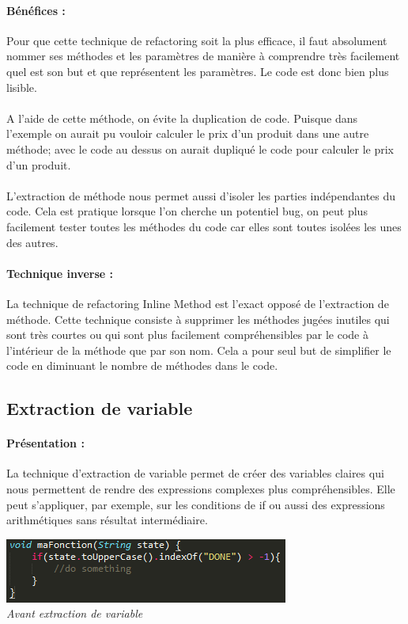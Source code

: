 \documentclass[a4paper,twoside,12pt,openright]{report}
\begin{document}
\paragraph{Bénéfices :}
Pour que cette technique de refactoring soit la plus efficace, il faut absolument nommer ses méthodes et les paramètres de manière à comprendre très facilement quel est son but et que représentent les paramètres. Le code est donc bien plus lisible.\\\\
A l'aide de cette méthode, on évite la duplication de code. Puisque dans l'exemple on aurait pu vouloir calculer le prix d'un produit dans une autre méthode; avec le code au dessus on aurait dupliqué le code pour calculer le prix d'un produit.\\\\
L'extraction de méthode nous permet aussi d'isoler les parties indépendantes du code. Cela est pratique lorsque l'on cherche un potentiel bug, on peut plus facilement tester toutes les méthodes du code car elles sont toutes isolées les unes des autres.

\paragraph{Technique inverse :}
La technique de refactoring Inline Method est l'exact opposé de l'extraction de méthode. Cette technique consiste à supprimer les méthodes jugées inutiles qui sont très courtes ou qui sont plus facilement compréhensibles par le code à l'intérieur de la méthode que par son nom. Cela a pour seul but de simplifier le code en diminuant le nombre de méthodes dans le code.\\

\subsection{Extraction de variable}
\paragraph{Présentation :}
La technique d'extraction de variable permet de créer des variables claires qui nous permettent de rendre des expressions complexes plus compréhensibles.
Elle peut s'appliquer, par exemple, sur les conditions de if ou aussi des expressions arithmétiques sans résultat intermédiaire.

\begin{center}
\includegraphics[scale=1]{Image/Extraction_Variable.png}\\
\itshape{Avant extraction de variable}
\end{center}
\end{document}
